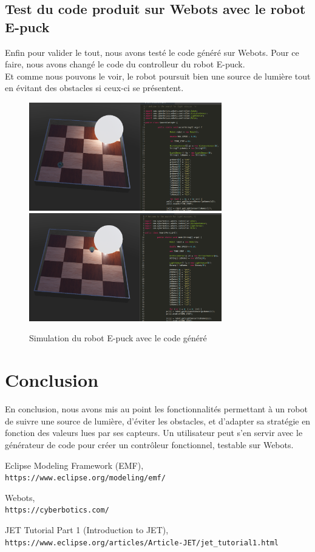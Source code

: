 \documentclass[a4paper,12pt]{article}
\begin{document}
\newpage
\subsection{Test du code produit sur Webots avec le robot E-puck}
Enfin pour valider le tout, nous avons testé le code généré sur Webots. Pour ce faire, nous avons changé le code du controlleur du robot E-puck. 
\\Et comme nous pouvons le voir, le robot poursuit bien une source de lumière tout en évitant des obstacles si ceux-ci se présentent.

\begin{figure}[!h]  
    \centering
    \includegraphics[width=8.4cm]{simu_1.png}
    \includegraphics[width=8.4cm]{simu_3.png}
    \caption{Simulation du robot E-puck avec le code généré}
\end{figure}

\vspace{1cm}
\section{Conclusion}
En conclusion, nous avons mis au point les fonctionnalités permettant à un robot de suivre une source de lumière, d’éviter les obstacles, et d’adapter sa stratégie en fonction des valeurs lues par ses capteurs. Un utilisateur peut s’en servir avec le générateur de code pour créer un contrôleur fonctionnel, testable sur Webots.
\vspace{4cm}

\begin{thebibliography}{9}

    Eclipse Modeling Framework (EMF),
    \\\texttt{https://www.eclipse.org/modeling/emf/}

    Webots,
    \\\texttt{https://cyberbotics.com/}

    JET Tutorial Part 1 (Introduction to JET),
    \\\texttt{https://www.eclipse.org/articles/Article-JET/jet\_{}tutorial1.html}

    \end{thebibliography}
    
\end{document}
